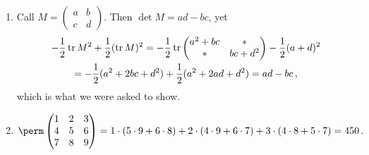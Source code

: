 \begin{enumerate}
Thus
\[
X=\begin{pmatrix}3&1& -1\\ 0&-2& 1 \\-2&1 & 0 \end{pmatrix}
\begin{pmatrix}1\\2\\3
\end{pmatrix}=
\begin{pmatrix}2\\-1\\0
\end{pmatrix}\, .
\]
Finally, 
\[
P_A(\lambda)=-\det \begin{pmatrix}1-\lambda&1&1\\2&2-\lambda&3\\4&5&6-\lambda\end{pmatrix}\]
\begin{gather*}
=-\Big[(1-\lambda)[(2-\lambda)(6-\lambda)-15]-[2.(6-\lambda)-12]+[10-4.(2-\lambda)]\Big]
\\
=\lambda^3-9\lambda^2-\lambda+1\, .
\end{gather*}
\item
Call $M=\begin{pmatrix}a&b\\c&d\end{pmatrix}$. Then $\det M= ad-bc$, yet
\begin{gather*}
-\frac 12 \operatorname{tr} M^2 + \frac12 (\operatorname{tr} M)^2 = -\frac 12 \operatorname{tr} \begin{pmatrix}a^2 + bc & * \\ * & bc + d^2\end{pmatrix} -\frac12 (a+d)^2\\ 
=-\frac 12 (a^2 + 2bc + d^2) + \frac 12 (a^2 + 2ad + d^2) = ad - bc\, ,
\end{gather*}
which is what we were asked to show.

\item 

\[
\perm\begin{pmatrix}1 & 2 & 3 \\ 4 & 5 & 6 \\ 7 & 8 & 9\end{pmatrix}
=1\cdot(5\cdot9+6\cdot8)+2\cdot(4\cdot9+6\cdot7)+3\cdot(4\cdot8+5\cdot7)=450\, .
\]


\end{enumerate}
